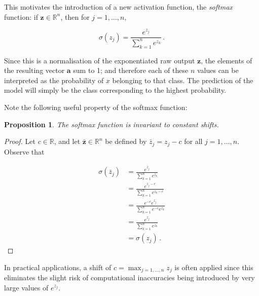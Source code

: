 \documentclass{article}[11pt]
\newtheorem{proposition}{Proposition}
\begin{document}
        This motivates the introduction of a new activation function, the \textit{softmax} function: if $\mathbf{z} \in \mathbb{R}^n$, then for $j = 1, \ldots, n$,
        
        $$
        \sigma(z_j) = \frac{e^{z_j}}{\sum_{k=1}^{n} e^{z_k}} \,.
        $$
        
        Since this is a normalisation of the exponentiated raw output $\mathbf{z}$, the elements of the resulting vector $\mathbf{a}$ sum to 1; and therefore each of these $n$ values can be interpreted as the probability of $x$ belonging to that class. The prediction of the model will simply be the class corresponding to the highest probability.
        
        Note the following useful property of the softmax function: 
        
        \begin{proposition}
            
            The softmax function is invariant to constant shifts.
            
        \end{proposition}
    
        \begin{proof}
            
            Let $c \in \mathbb{R}$, and let $\mathbf{\bar{z}} \in \mathbb{R}^n$ be defined by $\bar{z}_j = z_j - c$ for all $j = 1, \ldots, n$. Observe that
            
            $$ \begin{aligned}
                \sigma(\bar{z}_j)
                &= \frac{e^{\bar{z}_j}}{\sum_{k=1}^{n} e^{\bar{z}_k}} \\
                &= \frac{e^{z_j - c}}{\sum_{k=1}^{n} e^{z_k - c}} \\
                &= \frac{e^{-c} e^{z_j}}{\sum_{k=1}^{n} e^{-c} e^{z_k}} \\
                &= \frac{e^{z_j}}{\sum_{k=1}^{n} e^{z_k}} \\
                &= \sigma(z_j) \,.
            \end{aligned} $$
            
        \end{proof}
        
        In practical applications, a shift of $c = \max_{j = 1, \ldots, n} z_j$ is often applied since this eliminates the slight risk of computational inaccuracies being introduced by very large values of $e^{z_j}$.
        
\end{document}
